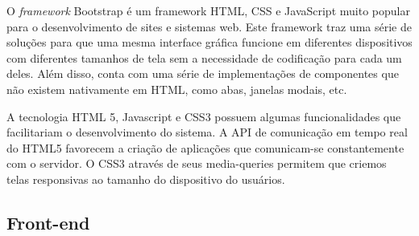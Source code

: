 O \emph{framework} Bootstrap é um framework HTML, CSS e JavaScript muito popular para o desenvolvimento de sites e sistemas web. Este framework traz uma série de soluções para que uma mesma interface gráfica funcione em diferentes dispositivos com diferentes tamanhos de tela sem a necessidade de codificação para cada um deles. Além disso, conta com uma série de implementações de componentes que não existem nativamente em HTML, como abas, janelas modais, etc.



\iffalse

A tecnologia HTML 5, Javascript e CSS3 possuem algumas funcionalidades que facilitariam o desenvolvimento do sistema. A API de comunicação em tempo real do HTML5 favorecem a criação de aplicações que comunicam-se constantemente com o servidor. O CSS3 através de seus media-queries permitem que criemos telas responsivas ao tamanho do dispositivo do usuários.


\subsection{Front-end}
\label{sec:tecnologias_frontend}



